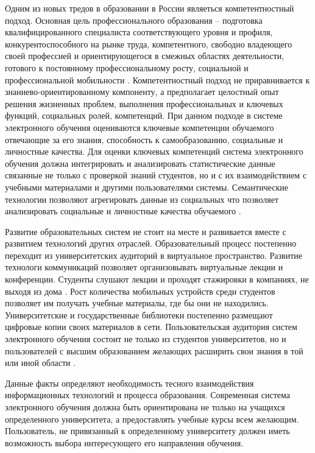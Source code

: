 Одним из новых тредов в образовании в России являеться компетентностный подход.
Основная цель профессионального образования – подготовка квалифицированного специалиста соответствующего уровня и профиля, конкурентоспособного на рынке труда, компетентного, свободно владеющего своей профессией и ориентирующегося в смежных областях деятельности, готового к постоянному профессиональному росту, социальной и профессиональной мобильности \cite{chel2013control}. Компетентностный подход не приравнивается к знаниево-ориентированному компоненту, а предполагает целостный опыт решения жизненных проблем, выполнения профессиональных и ключевых функций, социальных ролей, компетенций. При данном подходе в системе электронного обучения оцениваются ключевые компетенции обучаемого отвечающие за его знания, способность к самообразованию, социальные и личностные качества. Для оценки ключевых компетенций система электронного обучения должна интегрировать и анализировать статистические данные связанные не только с проверкой знаний студентов, но и с их взаимодействием с учебными материалами и другими пользователями системы. Семантические технологии позволяют агрегировать данные из социальных что позволяет анализировать социальные и личностные качества обучаемого \cite{abel2013cross}.  

Развитие образовательных систем не стоит на месте и развивается вместе с развитием технологий других отраслей. Образовательный процесс постепенно переходит из университетских аудиторий в виртуальное пространство. Развитие технологи коммуникаций позволяет организовывать виртуальные лекции и конференции. Студенты слушают лекции и проходят стажировки в компаниях, не выходя из дома \cite{masie2012connecting}. Рост количества мобильных устройств среди студентов позволяет им получать учебные материалы, где бы они не находились. Университетские и государственные библиотеки постепенно размещают цифровые копии своих материалов в сети. Пользовательская аудитория систем электронного обучения состоит не только из студентов университетов, но и пользователей с высшим образованием желающих расширить свои знания в той или иной области \cite{oblinger2010campus}. 

Данные факты определяют необходимость тесного взаимодействия информационных технологий и процесса образования. Современная система электронного обучения должна быть ориентирована не только на учащихся определенного университета, а предоставлять учебные курсы всем желающим. Пользователь, не привязанный к определенному университету должен иметь возможность выбора интересующего его направления обучения. 

